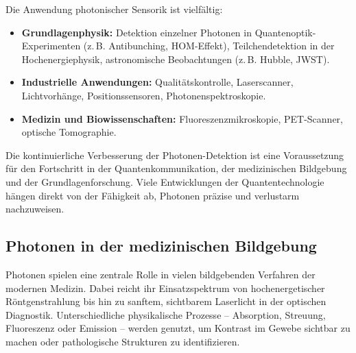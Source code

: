 Die Anwendung photonischer Sensorik ist vielfältig:

\begin{itemize}
	\item \textbf{Grundlagenphysik:} Detektion einzelner Photonen in Quantenoptik-Experimenten (z.\,B. Antibunching, HOM-Effekt), Teilchendetektion in der Hochenergiephysik, astronomische Beobachtungen (z.\,B. Hubble, JWST).
	\item \textbf{Industrielle Anwendungen:} Qualitätskontrolle, Laserscanner, Lichtvorhänge, Positionssensoren, Photonenspektroskopie.
	\item \textbf{Medizin und Biowissenschaften:} Fluoreszenzmikroskopie, PET-Scanner, optische Tomographie.
\end{itemize}

\begin{tcolorbox}[hinweisbox, title=Hinweis zur Bedeutung der Detektionstechnologie]
	\label{box:detektionstechnologie}
	Die kontinuierliche Verbesserung der Photonen-Detektion ist eine Voraussetzung für den Fortschritt in der Quantenkommunikation, der medizinischen Bildgebung und der Grundlagenforschung. Viele Entwicklungen der Quantentechnologie hängen direkt von der Fähigkeit ab, Photonen präzise und verlustarm nachzuweisen.
\end{tcolorbox}

\subsection{Photonen in der medizinischen Bildgebung}

Photonen spielen eine zentrale Rolle in vielen bildgebenden Verfahren der modernen Medizin. Dabei reicht ihr Einsatzspektrum von hochenergetischer Röntgenstrahlung bis hin zu sanftem, sichtbarem Laserlicht in der optischen Diagnostik. Unterschiedliche physikalische Prozesse – Absorption, Streuung, Fluoreszenz oder Emission – werden genutzt, um Kontrast im Gewebe sichtbar zu machen oder pathologische Strukturen zu identifizieren.

